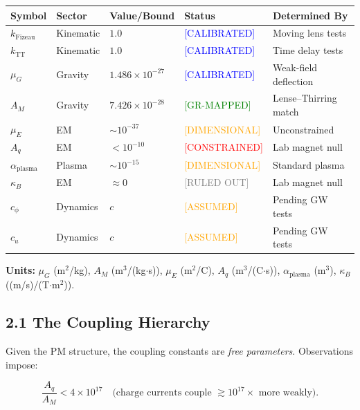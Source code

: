 \documentclass{article}
\begin{document}
\begin{center}
\begin{tabular}{llllp{4cm}}
\toprule
\textbf{Symbol} & \textbf{Sector} & \textbf{Value/Bound} & \textbf{Status} & \textbf{Determined By} \\
\midrule
$k_{\text{Fizeau}}$ & Kinematic & $1.0$ & \textcolor{blue}{[CALIBRATED]} & Moving lens tests \\
$k_{\text{TT}}$ & Kinematic & $1.0$ & \textcolor{blue}{[CALIBRATED]} & Time delay tests \\
\midrule
$\mu_G$ & Gravity & $1.486 \times 10^{-27}$ & \textcolor{blue}{[CALIBRATED]} & Weak-field deflection \\
$A_M$ & Gravity & $7.426 \times 10^{-28}$ & \textcolor{green}{[GR-MAPPED]} & Lense--Thirring match \\
\midrule
$\mu_E$ & EM & $\sim 10^{-37}$ & \textcolor{orange}{[DIMENSIONAL]} & Unconstrained \\
$A_q$ & EM & $< 10^{-10}$ & \textcolor{red}{[CONSTRAINED]} & Lab magnet null \\
$\alpha_{\text{plasma}}$ & Plasma & $\sim 10^{-15}$ & \textcolor{orange}{[DIMENSIONAL]} & Standard plasma \\
$\kappa_B$ & EM & $\approx 0$ & \textcolor{gray}{[RULED OUT]} & Lab magnet null \\
\midrule
$c_\phi$ & Dynamics & $c$ & \textcolor{orange}{[ASSUMED]} & Pending GW tests \\
$c_u$ & Dynamics & $c$ & \textcolor{orange}{[ASSUMED]} & Pending GW tests \\
\bottomrule
\end{tabular}
\end{center}

\textbf{Units:}
$\mu_G$ (m$^2$/kg), $A_M$ (m$^3$/(kg$\cdot$s)), $\mu_E$ (m$^2$/C), $A_q$
(m$^3$/(C$\cdot$s)), $\alpha_{\text{plasma}}$ (m$^3$), $\kappa_B$
((m/s)/(T$\cdot$m$^2$)).

\subsection*{2.1 The Coupling Hierarchy}

Given the PM structure, the coupling constants are \emph{free parameters}.
Observations impose:



\[
\frac{A_q}{A_M} < 4 \times 10^{17}
\quad\text{(charge currents couple $\gtrsim 10^{17}\times$ more weakly)}.
\]
\end{document}
